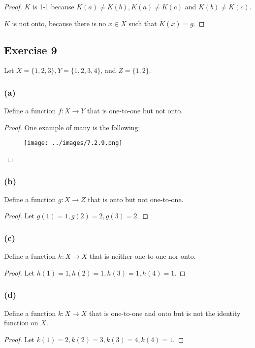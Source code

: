 \documentclass[14pt]{extarticle}
\begin{document}
\begin{proof}
    $K$ is 1-1 because \(K(a) \neq K(b), K(a) \neq K(c)\) and \(K(b) \neq K(c)\).

    $K$ is not onto, because there is no $x \in X$ such that $K(x) = g$.
\end{proof}

\subsection{Exercise 9}
Let \(X = \{1, 2, 3\}, Y = \{1, 2, 3, 4\}\), and \(Z = \{1, 2\}\).

\subsubsection{(a)}
Define a function \(f: X \to Y\) that is one-to-one but not onto.

\begin{proof}
    One example of many is the following:
    \begin{figure}[ht!]
        \centering
        \texttt{[image: ../images/7.2.9.png]}
    \end{figure}
\end{proof}

\subsubsection{(b)}
Define a function \(g: X \to Z\) that is onto but not one-to-one.

\begin{proof}
    Let \(g(1) = 1, g(2) = 2, g(3) = 2\).
\end{proof}

\subsubsection{(c)}
Define a function \(h: X \to X\) that is neither one-to-one nor onto.

\begin{proof}
    Let \(h(1) = 1, h(2) = 1, h(3) = 1, h(4) = 1\).
\end{proof}

\subsubsection{(d)}
Define a function \(k: X \to X\) that is one-to-one and onto but is not the identity function on $X$.

\begin{proof}
    Let \(k(1) = 2, k(2) = 3, k(3) = 4, k(4) = 1\).
\end{proof}
\end{document}
